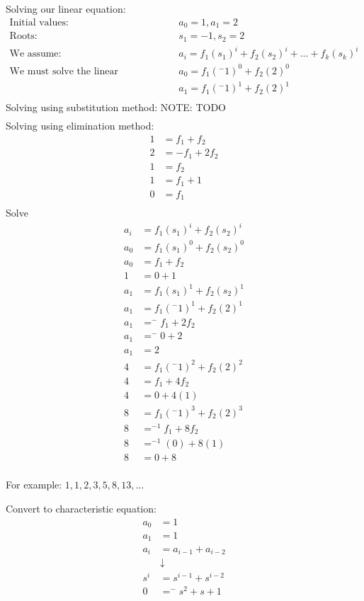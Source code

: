 \documentclass{article}
\begin{document}
Solving our linear equation:
\begin{align*}
\text{Initial values:} & \qquad a_0 = 1, a_1 = 2 \\
\text{Roots:} & \qquad s_1 = -1, s_2 = 2 \\
\text{We assume:} & \qquad a_i = f_1(s_1)^i + f_2(s_2)^i + ... + f_k(s_k)^i \\ 
\text{We must solve the linear equation:} 
& \qquad a_0 = f_1(^{-}1)^0 + f_2(2)^0 \\
& \qquad a_1 = f_1(^{-}1)^1 + f_2(2)^1 \\
\end{align*}
Solving using substitution method: 
NOTE: TODO
\begin{align*}
\end{align*}
Solving using elimination method: 
\begin{align*}
1 &= f_1 + f_2 \\
2 &= -f_1 + 2f_2 \\
1 &= f_2 \\
1 &= f_1 + 1 \\
0 &= f_1  \\
\end{align*}
Solve
\begin{align*}
a_i &= f_1(s_1)^i + f_2(s_2)^i \\
a_0 &= f_1(s_1)^0 + f_2(s_2)^0 \\
a_0 &= f_1 + f_2 \\
1 &= 0 + 1 \\
a_1 &= f_1(s_1)^1 + f_2(s_2)^1 \\
a_1 &= f_1(^{-}1)^1 + f_2(2)^1 \\
a_1 &= ^{-}f_1 + 2f_2 \\
a_1 &= ^{-}0 + 2 \\
a_1 &= 2 \\
4 &= f_1(^{-}1)^2 + f_2(2)^2 \\
4 &= f_1 + 4f_2 \\
4 &= 0 + 4(1) \\
8 &= f_1(^{-}1)^3 + f_2(2)^3 \\
8 &= ^{-1}f_1 + 8f_2 \\
8 &= ^{-1}(0) + 8(1) \\
8 &= 0 + 8 \\
\end{align*}

For example: $1, 1, 2, 3, 5, 8, 13, …$

Convert to characteristic equation: 
\begin{align*}
a_0 &= 1 \\
a_1 &= 1 \\
a_i &= a_{i-1} + a_{i-2} \\
& \downarrow \\
s^i &= s^{i-1} + s^{i-2} \\
0 &= ^{-}s^2 + s + 1
\end{align*}
\end{document}
